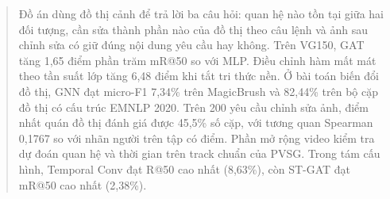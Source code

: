 \begin{abstract}
Đồ án dùng đồ thị cảnh để trả lời ba câu hỏi: quan hệ nào tồn tại giữa hai đối tượng,
cần sửa thành phần nào của đồ thị theo câu lệnh và ảnh sau chỉnh sửa có giữ đúng
nội dung yêu cầu hay không. Trên VG150, GAT tăng 1,65 điểm phần trăm mR@50 so
với MLP. Điều chỉnh hàm mất mát theo tần suất lớp tăng 6,48 điểm khi tắt tri thức
nền. Ở bài toán biến đổi đồ thị, GNN đạt micro-F1 7,34\% trên MagicBrush và
82,44\% trên bộ cặp đồ thị có cấu trúc EMNLP 2020. Trên 200 yêu cầu chỉnh sửa ảnh,
điểm nhất quán đồ thị đánh giá được 45,5\% số cặp, với tương quan Spearman 0,1767
so với nhãn người trên tập có điểm. Phần mở rộng video kiểm tra dự đoán quan hệ
và thời gian trên track chuẩn của PVSG. Trong tám cấu hình, Temporal Conv đạt
R@50 cao nhất (8,63\%), còn ST-GAT đạt mR@50 cao nhất (2,38\%).
\end{abstract}
